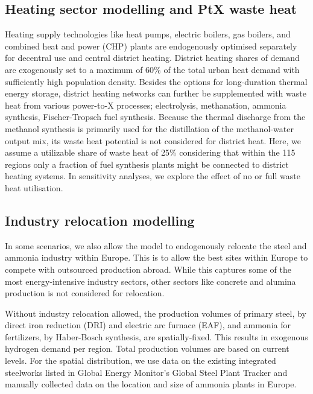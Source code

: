 \subsection*{Heating sector modelling and PtX waste heat}


Heating supply technologies like heat pumps, electric boilers, gas boilers, and
combined heat and power (CHP) plants are endogenously optimised separately for
decentral use and central district heating. District heating shares of demand
are exogenously set to a maximum  of 60\% of the total urban heat demand with
sufficiently high population density. Besides the options for long-duration
thermal energy storage, district heating networks can further be supplemented
with waste heat from various power-to-X processes; electrolysis, methanation,
ammonia synthesis, Fischer-Tropsch fuel synthesis. Because the thermal discharge
from the methanol synthesis is primarily used for the distillation of the
methanol-water output mix,\cite{brownUltralongdurationEnergyStorage2023} its
waste heat potential is not considered for district heat. Here, we assume a
utilizable share of waste heat of 25\% considering that within the 115 regions
only a fraction of fuel synthesis plants might be connected to district heating
systems. In sensitivity analyses, we explore the effect of no or full waste heat
utilisation.


\subsection*{Industry relocation modelling}

In some scenarios, we also allow the model to endogenously relocate the steel
and ammonia industry within Europe. This is to allow the best sites within
Europe to compete with outsourced production abroad. While this captures some of
the most energy-intensive industry sectors, other sectors like concrete and
alumina production is not considered for relocation.

Without industry relocation allowed, the production volumes of primary steel, by
direct iron reduction (DRI) and electric arc furnace (EAF), and ammonia for
fertilizers, by Haber-Bosch synthesis, are spatially-fixed. This results in
exogenous hydrogen demand per region. Total production volumes are based on
current
levels.\cite{unitedstatesgeologicalsurveyAmmoniaProductionCountry2022,europeancommission.jointresearchcentre.JRCIDEES2021IntegratedDatabase2024}
For the spatial distribution, we use data on the existing integrated steelworks
listed in Global Energy Monitor's Global Steel Plant Tracker
\cite{globalenergymonitorGlobalSteelPlant2024} and manually collected data on
the location and size of ammonia plants in Europe.

